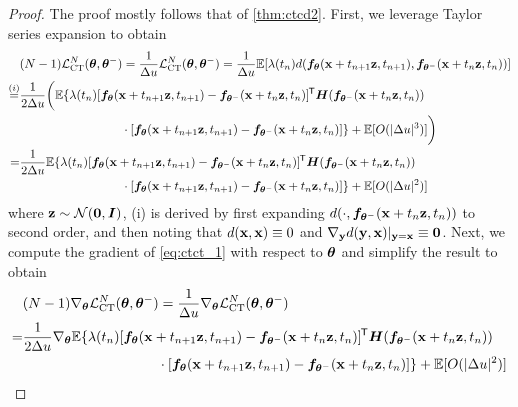 \begin{appendices}
\begin{proof}
    The proof mostly follows that of \cref{thm:ctcd2}. First, we leverage Taylor series expansion to obtain
    \begin{align}
        &(N-1)\mcal{L}_\text{CT}^N(\vtheta, \vtheta^{-}) = \frac{1}{\Delta u}\mcal{L}_\text{CT}^N(\vtheta, \vtheta^{-}) = \frac{1}{\Delta u} \mbb{E}[\lambda(t_n) d(\vf_\vtheta(\rvx + t_{n+1}\rvz, t_{n+1}), \vf_{\vtheta^{-}}(\rvx + t_n\rvz, t_n))]\notag \\
        \stackrel{(i)}{=}&\begin{multlined}[t][0.9\displaywidth]
            \frac{1}{2 \Delta u}\bigg(\mbb{E}\{\lambda(t_n)[\vf_\vtheta(\rvx + t_{n+1}\rvz, t_{n+1}) - \vf_{\vtheta^-}(\rvx + t_n \rvz, t_n)]\tran \mH(\vf_{\vtheta^{-}}(\rvx + t_n \rvz, t_n))\\ \cdot [\vf_\vtheta(\rvx + t_{n+1}\rvz, t_{n+1}) - \vf_{\vtheta^{-}}(\rvx + t_n \rvz, t_n)]\} + \mbb{E}[O(|\Delta u|^3)]\bigg)
        \end{multlined}\notag \\
        =&\begin{multlined}[t][0.9\displaywidth]
            \frac{1}{2\Delta u}\mbb{E}\{\lambda(t_n)[\vf_\vtheta(\rvx + t_{n+1}\rvz, t_{n+1}) - \vf_{\vtheta^-}(\rvx + t_n \rvz, t_n)]\tran \mH(\vf_{\vtheta^{-}}(\rvx + t_n \rvz, t_n))\\ \cdot [\vf_\vtheta(\rvx + t_{n+1}\rvz, t_{n+1}) - \vf_{\vtheta^-}(\rvx + t_n \rvz, t_n)]\} + \mbb{E}[O(|\Delta u|^2)]
        \end{multlined}\label{eq:ctct_1}
    \end{align}
    where ${\mathbf{z}} \sim \mathcal{N}(\bm{0}, {\bm{I}})$, (i) is derived by first expanding $d(\cdot, {\bm{f}}_{{\bm{\theta}}^{-}}({\mathbf{x}} + t_n{\mathbf{z}}, t_n))$ to second order, and then noting that $d({\mathbf{x}}, {\mathbf{x}}) \equiv 0$ and $\nabla_{\mathbf{y}} d({\mathbf{y}}, {\mathbf{x}})|_{{\mathbf{y}}={\mathbf{x}}} \equiv \bm{0}$. Next, we compute the gradient of \cref{eq:ctct_1} with respect to ${\bm{\theta}}$ and simplify the result to obtain
    \begin{align}
        &(N-1) \nabla_\vtheta \mcal{L}_\text{CT}^N(\vtheta, \vtheta^{-}) = \frac{1}{\Delta u} \nabla_\vtheta \mcal{L}_\text{CT}^N(\vtheta, \vtheta^{-})\notag \\
        =&\begin{multlined}[t][0.9\displaywidth]
            \frac{1}{2\Delta u} \nabla_\vtheta \mbb{E}\{\lambda(t_n)[\vf_\vtheta(\rvx + t_{n+1}\rvz, t_{n+1}) - \vf_{\vtheta^-}(\rvx + t_n \rvz, t_n)]\tran \mH(\vf_{\vtheta^{-}}(\rvx + t_n \rvz, t_n))\\ \cdot[\vf_\vtheta(\rvx + t_{n+1}\rvz, t_{n+1}) - \vf_{\vtheta^-}(\rvx + t_n \rvz, t_n)]\} + \mbb{E}[O(|\Delta u|^2)]

\end{multlined}
\end{align}
\end{proof}
\end{appendices}
